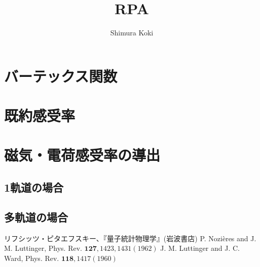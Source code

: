 \documentclass[11pt,a4j]{jarticle}
\title{RPA}
\author{Shimura Koki}
\date{}
\begin{document}
\maketitle
\section{バーテックス関数}
\section{既約感受率}
\section{磁気・電荷感受率の導出}
\subsection{1軌道の場合}
\subsection{多軌道の場合}


\begin{thebibliography}{99}
     リフシッツ・ピタエフスキー、『量子統計物理学』(岩波書店)
    P. Nozières and J. M. Luttinger, Phys. Rev. $\bm{127}, 1423, 1431(1962)$
    J. M. Luttinger and J. C. Ward, Phys. Rev. $\bm{118}, 1417(1960)$
\end{thebibliography}
\end{document}
